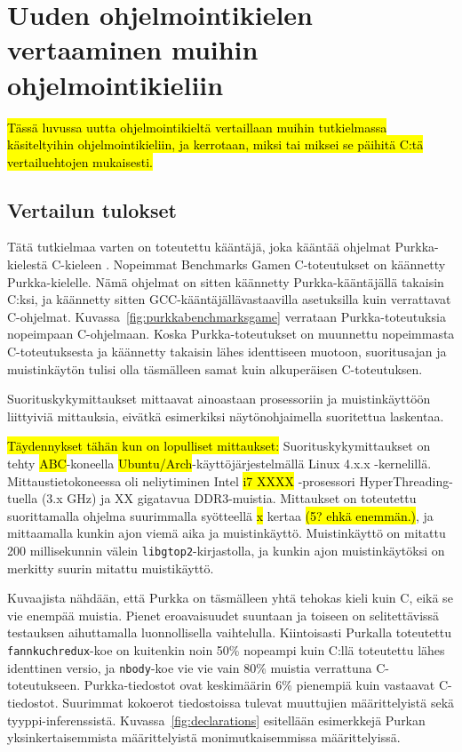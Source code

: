 \section{Uuden ohjelmointikielen vertaaminen muihin ohjelmointikieliin}

\hl{Tässä luvussa uutta ohjelmointikieltä vertaillaan muihin tutkielmassa
käsiteltyihin ohjelmointikieliin, ja kerrotaan, miksi tai miksei se päihitä
C:tä vertailuehtojen mukaisesti.}

\subsection{Vertailun tulokset}
\label{sec:results}

Tätä tutkielmaa varten on toteutettu kääntäjä, joka kääntää ohjelmat
Purkka-kielestä C-kieleen \citep{purkka}. Nopeimmat Benchmarks Gamen
C-toteutukset on käännetty Purkka-kielelle. Nämä ohjelmat on sitten käännetty
Purkka-kääntäjällä takaisin C:ksi, ja käännetty sitten
GCC-kääntäjällä\citationneeded vastaavilla asetuksilla kuin verrattavat
C-ohjelmat. Kuvassa~\ref{fig:purkkabenchmarksgame} verrataan Purkka-toteutuksia
nopeimpaan C-ohjelmaan. Koska Purkka-toteutukset on muunnettu nopeimmasta
C-toteutuksesta ja käännetty takaisin lähes identtiseen muotoon, suoritusajan
ja muistinkäytön tulisi olla täsmälleen samat kuin alkuperäisen C-toteutuksen.

Suorituskykymittaukset mittaavat ainoastaan prosessoriin ja muistinkäyttöön
liittyiviä mittauksia, eivätkä esimerkiksi näytönohjaimella suoritettua
laskentaa.

\hl{Täydennykset tähän kun on lopulliset mittaukset: } Suorituskykymittaukset
on tehty \hl{ABC}-koneella \hl{Ubuntu/Arch}-käyttöjärjestelmällä Linux 4.x.x
-kernelillä. Mittaustietokoneessa oli neliytiminen Intel \hl{i7 XXXX}
-prosessori HyperThreading-tuella (3.x GHz) ja XX gigatavua DDR3-muistia.
Mittaukset on toteutettu suorittamalla ohjelma suurimmalla syötteellä \hl{x}
kertaa \hl{(5? ehkä enemmän.)}, ja mittaamalla kunkin ajon viemä aika ja
muistinkäyttö. Muistinkäyttö on mitattu 200 millisekunnin välein
\texttt{libgtop2}-kirjastolla, ja kunkin ajon muistinkäytöksi on merkitty
suurin mitattu muistikäyttö.

Kuvaajista nähdään, että Purkka on täsmälleen yhtä tehokas kieli kuin C, eikä
se vie enempää muistia. Pienet eroavaisuudet suuntaan ja toiseen on
selitettävissä testauksen aihuttamalla luonnollisella vaihtelulla. Kiintoisasti
Purkalla toteutettu \texttt{fannkuchredux}-koe on kuitenkin noin 50\% nopeampi
kuin C:llä toteutettu lähes identtinen versio, ja \texttt{nbody}-koe vie vie
vain 80\% muistia verrattuna C-toteutukseen. Purkka-tiedostot ovat keskimäärin
6\% pienempiä kuin vastaavat C-tiedostot. Suurimmat kokoerot tiedostoissa
tulevat muuttujien määrittelyistä sekä tyyppi-inferenssistä.
Kuvassa~\ref{fig:declarations} esitellään esimerkkejä Purkan
yksinkertaisemmista määrittelyistä monimutkaisemmissa määrittelyissä.

